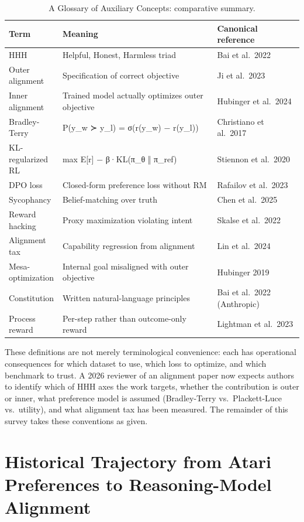 \documentclass{article}
\begin{document}
\begin{table}[t]
\centering
\caption{A Glossary of Auxiliary Concepts: comparative summary.}
\label{tab:a-glossary-of-auxiliary-concepts}
\begin{tabular}{>{\raggedright\arraybackslash}p{0.1848\linewidth}
  >{\raggedright\arraybackslash}p{0.5217\linewidth}
  >{\raggedright\arraybackslash}p{0.2935\linewidth}}
\toprule
Term & Meaning & Canonical reference \\
\midrule
HHH & Helpful, Honest, Harmless triad & Bai et al.~2022 \\
Outer alignment & Specification of correct objective & Ji et al.~2023 \\
Inner alignment & Trained model actually optimizes outer objective & Hubinger et al.~2024 \\
Bradley-Terry & P(y\_w ≻ y\_l) = σ(r(y\_w) − r(y\_l)) & Christiano et al.~2017 \\
KL-regularized RL & max E{[}r{]} − β·KL(π\_θ ‖ π\_ref) & Stiennon et al.~2020 \\
DPO loss & Closed-form preference loss without RM & Rafailov et al.~2023 \\
Sycophancy & Belief-matching over truth & Chen et al.~2025 \\
Reward hacking & Proxy maximization violating intent & Skalse et al.~2022 \\
Alignment tax & Capability regression from alignment & Lin et al.~2024 \\
Mesa-optimization & Internal goal misaligned with outer objective & Hubinger 2019 \\
Constitution & Written natural-language principles & Bai et al.~2022 (Anthropic) \\
Process reward & Per-step rather than outcome-only reward & Lightman et al.~2023 \\
\end{tabular}
\end{table}

These definitions are not merely terminological convenience: each has operational consequences for which dataset to use, which loss to optimize, and which benchmark to trust. A 2026 reviewer of an alignment paper now expects authors to identify which of HHH axes the work targets, whether the contribution is outer or inner, what preference model is assumed (Bradley-Terry vs.~Plackett-Luce vs.~utility), and what alignment tax has been measured. The remainder of this survey takes these conventions as given.

\section{Historical Trajectory from Atari Preferences to Reasoning-Model Alignment}\label{historical-trajectory-from-atari-preferences-to-reasoning-model-alignment}
\end{document}
